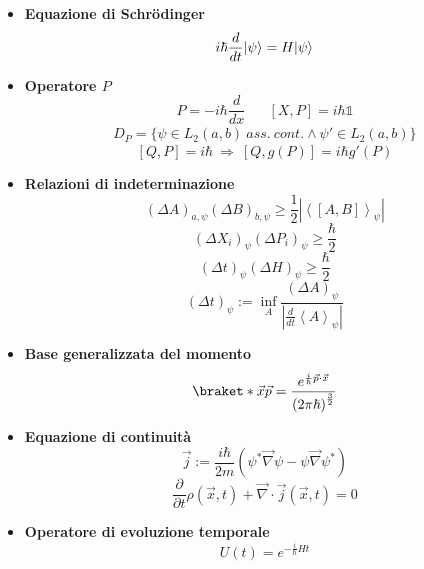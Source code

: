 \documentclass{article}
\DeclarePairedDelimiter\ket{\lvert}{\rangle}
\begin{document}
\begin{small}
\begin{multicols*}{3}
\begin{itemize}[leftmargin=*]
	\item \textbf{Equazione di Schr\"{o}dinger}
		\[i\hbar \frac{d}{dt} \ket{\psi } = H\ket{\psi }\]
	\item \textbf{Operatore $P$}
		\[P=-i\hbar \frac{d}{dx}%
		\hspace{20pt} \left[X,P\right] = i\hbar \mathds{1}\]
		\begin{align*}
			D_P = \{\psi \in L_2(a,b)\ ass.\ cont.  \land    \psi'\in L_2(a,b)\}
		\end{align*}
		\[\left[Q,P\right] = i\hbar \ \Rightarrow \ \left[Q,g(P)\right] = i\hbar g'(P)\]
	\item \textbf{Relazioni di indeterminazione}
		\[\left(\Delta A\right)_{a,\psi }\left(\Delta  B\right)_{b,\psi } \geq  \frac{1}{2} \left|\left<\left[A,B\right]\right>_{\psi }\right|\]
		\[\left(\Delta X_i\right)_\psi \left(\Delta P_i\right)_\psi \geq  \frac{\hbar }{2}\]
		\[\left(\Delta t\right)_\psi \left(\Delta H\right)_\psi \geq  \frac{\hbar }{2}\]
		\[\left(\Delta t\right)_\psi := \inf_A \frac{\left(\Delta A\right)_\psi }{\left|\frac{d}{dt} \left< A\right>_\psi \right|}\]
	\item \textbf{Base generalizzata del momento}
		\[\braket*{\vec{x}}{\vec{p}} = \frac{e^{\frac{i}{\hbar }\vec{p}\cdot \vec{x}}}{\left(2\pi \hbar \right)^{\frac{3}{2}}}\]
	\item \textbf{Equazione di continuità}
		\[\vec{j}:= \frac{i\hbar }{2m} \left(\psi ^* \vec{\nabla }\psi  - \psi \vec{\nabla }\psi ^*\right)\]
		\[\frac{\partial}{\partial t}\rho \left(\vec{x},t\right) + \vec{\nabla} \cdot \vec{j}\left(\vec{x},t\right)=0\]
	\item \textbf{Operatore di evoluzione temporale}
		\[U\left(t\right) = e^{-\frac{i}{\hbar } Ht}\]


\end{itemize}
\end{multicols*}
\end{small}
\end{document}
